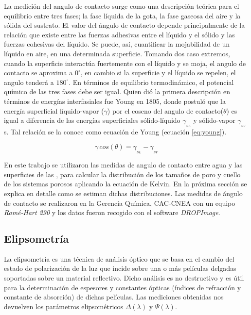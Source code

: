 		La medición del angulo de contacto surge como una descripción teórica para el equilibrio entre tres fases; la fase líquida de la gota, la fase gaseosa del aire y la sólida del sustrato. El valor del ángulo de contacto depende principalmente de la relación que existe entre las fuerzas adhesivas entre el líquido y el sólido y las fuerzas cohesivas del líquido. Se puede, así, cuantificar la mojabilidad de un líquido en aire, en una determinada superficie.\cite{findenegg1997} Tomando dos caso extremos, cuando la superficie interactúa fuertemente con el líquido y se moja, el angulo de contacto se aproxima a $0^{\circ}$, en cambio si la superficie y el líquido se repelen, el angulo tenderá a $180^{\circ}$. En términos de equilibrio termodinámico, el potencial químico de las tres fases  debe ser igual. Quien dió la primera descripción en términos de energías interfasiales fue Young en 1805\cite{young1805}, donde postuló que la energía superficial líquido-vapor ($\gamma$) por el coseno del angulo de contacto($\theta$) es igual a diferencia de las energías superficiales sólido-líquido $\gamma_{_{SL}}$ y sólido-vapor  $\gamma_{_{SV}}$s. Tal relación se la conoce como ecuación de Young (ecuación \ref{eq:young}).

			\begin{equation}
				\gamma\, cos(\theta) = \gamma_{_{SL}} - \gamma_{_{SV}}
				\label{eq:young} 
				\end{equation}

		En este trabajo se utilizaron las medidas de angulo de contacto entre agua y las superficies de las \pdm, para calcular la distribución de los tamaños de poro y cuello de los sistemas porosos aplicando la ecuación de Kelvin.\cite{Boissiere2005} En la próxima sección se explica en detalle como se estiman dichas distribuciones.
		Las medidas de ángulo de contacto se realizaron en la Gerencia Química, CAC-CNEA con un equipo \textit{Ramé-Hart 290} y los datos fueron recogido con el software \textit{DROPImage}.

	\subsection{Elipsometría}\label{sec:elipso}

		La elipsometría es una técnica de análisis óptico que se basa en el cambio del estado de polarización de la luz que incide sobre una o más películas delgadas soportadas sobre un material reflectivo. Dicho análisis es no destructivo y es útil para la determinación de espesores y constantes ópticas (índices de refracción y constante de absorción) de dichas películas.\cite{TompkinsHarlandG.1999,Rothen1945} Las mediciones obtenidas nos devuelven los parámetros elipsométricos $\Delta(\lambda)$ y $\Psi(\lambda)$. 

